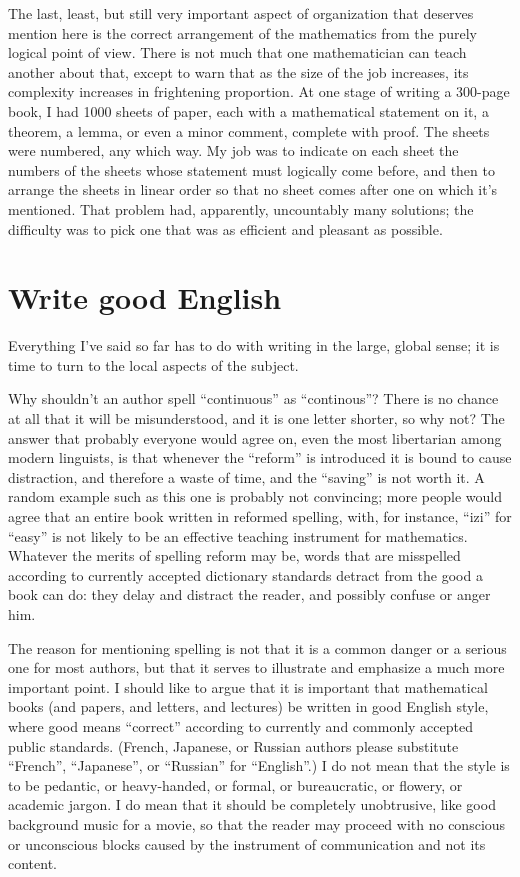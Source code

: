 \documentclass[12pt]{article}
\begin{document}
The last, least, but still very important aspect of organization that deserves mention here is the correct arrangement of the mathematics from the purely logical point of view. There is not much that one mathematician can teach another about that, except to warn that as the size of the job increases, its complexity increases in frightening proportion. At one stage of writing a 300-page book, I had 1000 sheets of paper, each with a mathematical statement on it, a theorem, a lemma, or even a minor comment, complete with proof. The sheets were numbered, any which way. My job was to indicate on each sheet the numbers of the sheets whose statement must logically come before, and then to arrange the sheets in linear order so that no sheet comes after one on which it's mentioned. That problem had, apparently, uncountably many solutions; the difficulty was to pick one that was as efficient and pleasant as possible.

\section{Write good English}

Everything I've said so far has to do with writing in the large, global sense; it is time to turn to the local aspects of the subject. 

Why shouldn't an author spell ``continuous'' as ``continous''? There is no chance at all that it will be misunderstood, and it is one letter shorter, so why not? The answer that probably everyone would agree on, even the most libertarian among modern linguists, is that whenever the ``reform'' is introduced it is bound to cause distraction, and therefore a waste of time, and the ``saving'' is not worth it. A random example such as this one is probably not convincing; more people would agree that an entire book written in reformed spelling, with, for instance, ``izi'' for ``easy'' is not likely to be an effective teaching instrument for mathematics. Whatever the merits of spelling reform may be, words that are misspelled according to currently accepted dictionary standards detract from the good a book can do: they delay and distract the reader, and possibly confuse or anger him. 

The reason for mentioning spelling is not that it is a common danger or a serious one for most authors, but that it serves to illustrate and emphasize a much more important point. I should like to argue that it is important that mathematical books (and papers, and letters, and lectures) be written in good English style, where good means ``correct'' according to currently and commonly accepted public standards. (French, Japanese, or Russian authors please substitute ``French'', ``Japanese'', or ``Russian'' for ``English''.) I do not mean that the style is to be pedantic, or heavy-handed, or formal, or bureaucratic, or flowery, or academic jargon. I do mean that it should be completely unobtrusive, like good background music for a movie, so that the reader may proceed with no conscious or unconscious blocks caused by the instrument of communication and not its content. 
\end{document}
